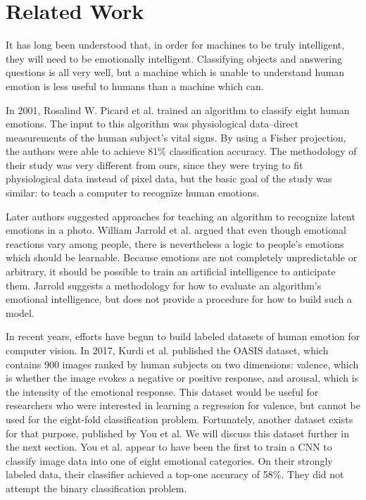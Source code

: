 \documentclass[10pt,twocolumn,letterpaper]{article}
\begin{document}
\section{Related Work}
It has long been understood that, in order for machines to be truly intelligent, they will need to be emotionally intelligent. Classifying objects and answering questions is all very well, but a machine which is unable to understand human emotion is less useful to humans than a machine which can.

In 2001, Rosalind W. Picard et al. trained an algorithm to classify eight human emotions\cite{earlyeq}. The input to this algorithm was physiological data--direct measurements of the human subject's vital signs. By using a Fisher projection, the authors were able to achieve 81\% classification accuracy. The methodology of their study was very different from ours, since they were trying to fit physiological data instead of pixel data, but the basic goal of the study was similar: to teach a computer to recognize human emotions.

Later authors suggested approaches for teaching an algorithm to recognize latent emotions in a photo. William Jarrold et al.\cite{methodologyproposed} argued that even though emotional reactions vary among people, there is nevertheless a logic to people's emotions which should be learnable. Because emotions are not completely unpredictable or arbitrary, it should be possible to train an artificial intelligence to anticipate them. Jarrold suggests a methodology for how to evaluate an algorithm's emotional intelligence, but does not provide a procedure for how to build such a model.

In recent years, efforts have begun to build labeled datasets of human emotion for computer vision. In 2017, Kurdi et al. published the OASIS dataset\cite{oasis}, which contains 900 images ranked by human subjects on two dimensions: valence, which is whether the image evokes a negative or positive response, and arousal, which is the intensity of the emotional response. This dataset would be useful for researchers who were interested in learning a regression for valence, but cannot be used for the eight-fold classification problem. Fortunately, another dataset exists for that purpose, published by You et al\cite{ourdata}. We will discuss this dataset further in the next section. You et al. appear to have been the first to train a CNN to classify image data into one of eight emotional categories. On their strongly labeled data, their classifier achieved a top-one accuracy of 58\%. They did not attempt the binary classification problem.
\end{document}
